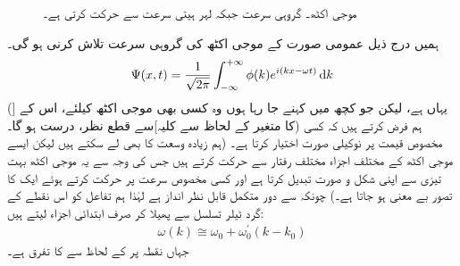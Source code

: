 \begin{figure}
\centering
{}
\caption
{موجی اکٹھ۔ گروہی سرعت جبکہ لہر ہیتی سرعت سے حرکت کرتی ہے۔}
\label{شکل_غیر_تابع_موجی_اکٹھ_رفتاریں}
\end{figure}
 ہمیں درج ذیل عمومی صورت کے موجی اکٹھ کی گروہی سرعت تلاش کرنی ہو گی۔ 
\begin{align*}
\Psi (x,t) = \frac{1}{\sqrt{2\pi}} \int_{- \infty}^{+ \infty} \phi (k) e^{i(kx - \omega t)} \dif k
\end{align*}
 (یہاں  ہے، لیکن جو کچھ میں کہنے جا رہا ہوں وہ کسی بھی موجی اکٹھ کیلئے، اس کے  [ کا متغیر  کے لحاظ سے کلیہ]سے قطع نظر، درست ہو گا۔)  ہم فرض کرتے ہیں کہ کسی مخصوص قیمت  پر  نوکیلی صورت اختیار کرتا ہے۔ (ہم زیادہ وسعت کا  بھی لے سکتے ہیں لیکن ایسے موجی اکٹھ کے مختلف اجزاء مختلف رفتار سے حرکت کرتے ہیں جس کی وجہ سے یہ موجی اکٹھ بہت تیزی سے اپنی شکل و صورت تبدیل کرتا ہے اور کسی مخصوص سرعت پر حرکت کرتے ہوئے ایک  کا تصور بے معنی ہو جاتا ہے۔) چونکہ  سے دور متکمل قابل نظر انداز ہے لہٰذا ہم تفاعل  کو اس نقطے کے گرد ٹیلر تسلسل سے پھیلا کر صرف ابتدائی اجزاء لیتے ہیں:
\begin{align*}
\omega (k) \cong \omega_{0} + \omega_{0}^{'} (k-k_{0})
\end{align*}
 جہاں نقطہ  پر  کے لحاظ سے  کا تفرق  ہے۔
 
